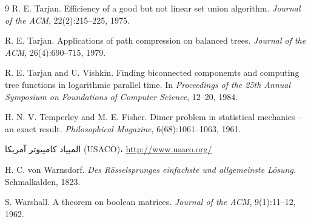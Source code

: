 \begin{thebibliography}{9}
  R. E. Tarjan.
  Efficiency of a good but not linear set union algorithm.
  \emph{Journal of the ACM}, 22(2):215--225, 1975.

  R. E. Tarjan.
  Applications of path compression on balanced trees.
  \emph{Journal of the ACM}, 26(4):690--715, 1979.

  R. E. Tarjan and U. Vishkin.
  Finding biconnected componemts and computing tree functions in logarithmic parallel time.
  In \emph{Proceedings of the 25th Annual Symposium on Foundations of Computer Science}, 12--20, 1984.

  H. N. V. Temperley and M. E. Fisher.
  Dimer problem in statistical mechanics -- an exact result.
  \emph{Philosophical Magazine}, 6(68):1061--1063, 1961.

  المپیاد کامپیوتر آمریکا (USACO)، \url{http://www.usaco.org/}

  H. C. von Warnsdorf.
  \emph{Des Rösselsprunges einfachste und allgemeinste Lösung}.
  Schmalkalden, 1823.

  S. Warshall.
  A theorem on boolean matrices.
  \emph{Journal of the ACM}, 9(1):11--12, 1962.


\end{thebibliography}